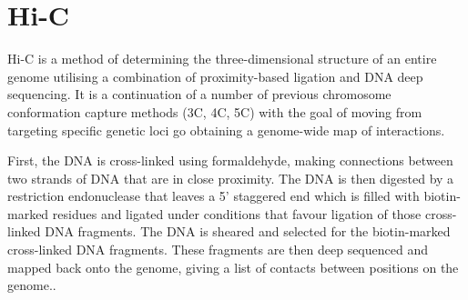 \documentclass[a4paper,11pt,oneside,final,english,toc=bib,draft]{scrbook}
\begin{document}
\cite{uzman_essential_2010}

\section{Hi-C} %
\label{sec:hi_c}

Hi-C is a method of determining the three-dimensional structure of an entire genome utilising a combination of proximity-based ligation and DNA deep sequencing. It is a continuation of a number of previous chromosome conformation capture methods (3C, 4C, 5C) with the goal of moving from targeting specific genetic loci go obtaining a genome-wide map of interactions.

First, the DNA is cross-linked using formaldehyde, making connections between two strands of DNA that are in close proximity. The DNA is then digested by a restriction endonuclease that leaves a 5' staggered end which is filled with biotin-marked residues and ligated under conditions that favour ligation of those cross-linked DNA fragments. The DNA is sheared and selected for the biotin-marked cross-linked DNA fragments. These fragments are then deep sequenced and mapped back onto the genome, giving a list of contacts between positions on the genome.\cite{lieberman-aiden_comprehensive_2009}.







\end{document}
